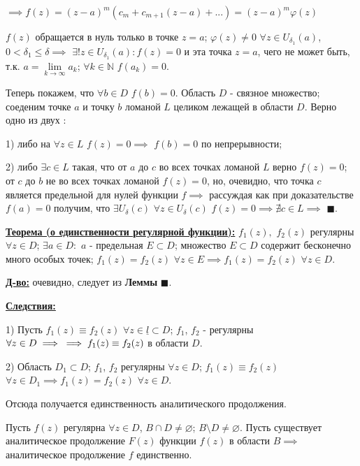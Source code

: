 \documentclass[a4paper, 12pt]{article}
\begin{document}
\begin{center}
	$\implies f(z) = (z-a)^{m} (c_m + c_{m+1}(z-a) + ... ) = (z-a)^{m} \varphi (z)$
\end{center}

\quad $f(z)$ обращается в нуль только в точке $z = a$; $\varphi (z) \neq 0$ $\forall z \in U_{\delta_1} (a)$, $0<\delta_1 \leq \delta \implies$ $\exists ! z \in U_{\delta_1} (a) : f(z) = 0$ и эта точка $z = a$, чего не может быть, т.к. $a = \lim\limits_{k \to \infty} a_k$; $\forall k \in \mathbb{N}$ $f(a_k) = 0$.

\quad Теперь покажем, что $\forall b \in D$ $f(b) = 0$. Область $D$ - связное множество; соеденим точке $a$ и точку $b$ ломаной $L$ целиком лежащей в области $D$. Верно одно из двух :

1) либо на $\forall z \in L$ $f(z) = 0 \implies $ $f(b) = 0$ по непрерывности;

2) либо $\exists c \in L$ такая, что от $a$ до $c$ во всех  точках ломаной $L$ верно $f(z) = 0$; от $c$ до $b$ не во всех точках ломаной $f(z) = 0$, но, очевидно, что точка $c$ является предельной для нулей функции $f \implies $ рассуждая как при доказательстве $f(a) = 0$ получим, что $\exists U_{\delta} (c)$ $\forall z \in U_{\delta} (c)$ $f(z) = 0 \implies \nexists c \in L \implies $ $\blacksquare$.

\quad \textbf{\underline{Теорема (о единственности регулярной функции):}} $f_1(z) ,$ $f_2(z)$ регулярны $\forall z \in D$; $\exists a \in D :$ $a$ - предельная $E \subset D$; множество $E \subset D$ содержит бесконечно много особых точек; $f_1(z) = f_2(z)$ $\forall z \in E \implies f_1(z) = f_2(z) $  $ \forall z \in D$.

\quad \textbf{\underline{Д-во:}} очевидно, следует из \textbf{Леммы} $\blacksquare$.

\quad \textbf{\underline{Следствия:}}

1) Пусть $f_1(z) \equiv f_2(z) $ $\forall z \in \underline{l} \subset D$; $f_1$, $f_2$ - регулярны $\forall z \in D \implies \newline \implies f_1(z) \equiv f_2(z)$ в области $D$.

2) Область $D_1 \subset D$; $f_1$, $f_2$ регулярны $\forall z \in D$; $f_1(z) \equiv f_2(z)$ $\forall z \in D_1 \implies f_1(z) = f_2(z)$ $\forall z \in D$.
 
 \quad Отсюда получается единственность аналитического продолжения. 
 
 \quad Пусть $f(z)$ регулярна $\forall z \in D$, $B \cap D \neq \varnothing $; $B \setminus D \neq \varnothing $. Пусть существует аналитическое продолжение $F(z)$ функции $f(z)$ в области $B \implies $ аналитическое продолжение $f$ единственно. 
 
\end{document}
